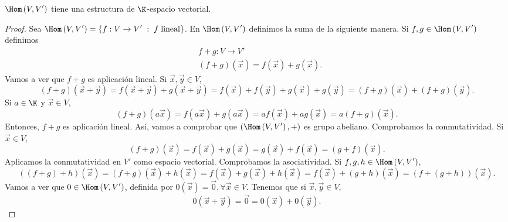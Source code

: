 \begin{ftheorem}[]
\normalfont $\displaystyle \Hom\left(V,V'\right) $ tiene una estructura de $\displaystyle \K $-espacio vectorial.
\end{ftheorem}
\begin{proof}

Sea $\displaystyle \Hom\left(V, V'\right) = \left\{ f: V \to V' \; : \; f \; \text{lineal}\right\}  $. En $\displaystyle \Hom\left(V, V'\right) $ definimos la suma de la siguiente manera. Si $\displaystyle f, g \in \Hom\left(V, V'\right) $ definimos 
\[
\begin{split}
& f + g : V \to V' \\
& \left(f+ g\right) \left(\vec{x}\right) = f\left(\vec{x}\right) + g\left(\vec{x}\right).
\end{split}
\]
Vamos a ver que $\displaystyle f + g $ es aplicación lineal. Si $\displaystyle \vec{x}, \vec{y} \in V $, 
\[\left(f+g\right)\left(\vec{x}+\vec{y}\right) = f\left(\vec{x} + \vec{y}\right) + g\left(\vec{x}+\vec{y}\right) = f\left(\vec{x}\right) + f\left(\vec{y}\right) + g\left(\vec{x}\right) + g\left(\vec{y}\right) = \left(f+g\right)\left(\vec{x}\right) + \left(f+g\right)\left(\vec{y}\right).\]
Si $\displaystyle a \in \K  $ y $\displaystyle \vec{x} \in V $, 
\[\left(f+g\right)\left(a\vec{x}\right) = f\left(a\vec{x}\right) + g\left(a\vec{x}\right) = af\left(\vec{x}\right) + a g\left(\vec{x}\right) = a \left(f+g\right)\left(\vec{x}\right) .\]
Entonces, $\displaystyle f+g $ es aplicación lineal. Así, vamos a comprobar que $\displaystyle \left( \Hom\left(V, V'\right), +\right) $ es grupo abeliano. Comprobamos la conmutatividad. Si $\displaystyle \vec{x} \in V $, 
\[\left(f+g\right)\left(\vec{x}\right) = f\left(\vec{x}\right) + g\left(\vec{x}\right) = g\left(\vec{x}\right) + f\left(\vec{x}\right) = \left(g+f\right)\left(\vec{x}\right) .\]
Aplicamos la conmutatividad en $\displaystyle V' $ como espacio vectorial. Comprobamos la asociatividad. Si $\displaystyle f, g, h \in \Hom\left(V, V'\right) $, 
\[(\left(f+g\right) + h)\left(\vec{x}\right) = \left(f+g\right)\left(\vec{x}\right)+h\left(\vec{x}\right) = f\left(\vec{x}\right) + g\left(\vec{x}\right) + h\left(\vec{x}\right) = f\left(\vec{x}\right) + \left(g+h\right)\left(\vec{x}\right) = \left(f+\left(g+h\right)\right)\left(\vec{x}\right) .\]
Vamos a ver que $\displaystyle 0 \in \Hom\left(V, V'\right) $, definida por $\displaystyle 0\left(\vec{x}\right) = \vec{0}, \forall\vec{x} \in V $. Tenemos que si $\displaystyle \vec{x}, \vec{y} \in V $, 
\[0 \left(\vec{x} + \vec{y}\right) = \vec{0} = 0\left(\vec{x}\right) + 0\left(\vec{y}\right) .\]

\end{proof}
